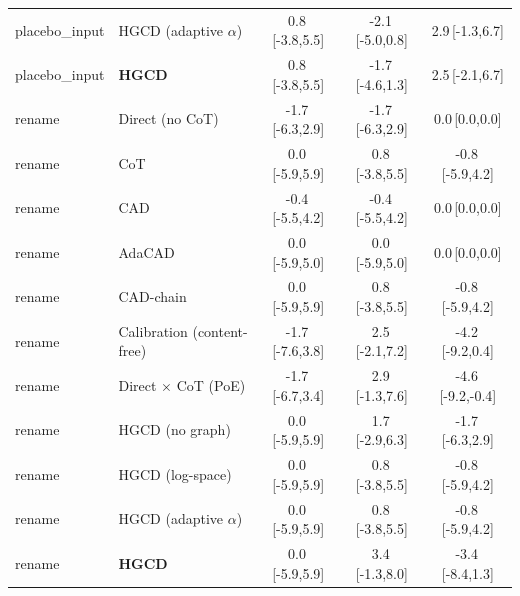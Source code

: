 \begin{tabular}{llccc}
placebo\_input & HGCD (adaptive $\alpha$) & 0.8\,{\scriptsize[-3.8,5.5]} & -2.1\,{\scriptsize[-5.0,0.8]} & 2.9\,{\scriptsize[-1.3,6.7]} \\
placebo\_input & \textbf{HGCD} & 0.8\,{\scriptsize[-3.8,5.5]} & -1.7\,{\scriptsize[-4.6,1.3]} & 2.5\,{\scriptsize[-2.1,6.7]} \\
\midrule
rename & Direct (no CoT) & -1.7\,{\scriptsize[-6.3,2.9]} & -1.7\,{\scriptsize[-6.3,2.9]} & 0.0\,{\scriptsize[0.0,0.0]} \\
rename & CoT & 0.0\,{\scriptsize[-5.9,5.9]} & 0.8\,{\scriptsize[-3.8,5.5]} & -0.8\,{\scriptsize[-5.9,4.2]} \\
rename & CAD & -0.4\,{\scriptsize[-5.5,4.2]} & -0.4\,{\scriptsize[-5.5,4.2]} & 0.0\,{\scriptsize[0.0,0.0]} \\
rename & AdaCAD & 0.0\,{\scriptsize[-5.9,5.0]} & 0.0\,{\scriptsize[-5.9,5.0]} & 0.0\,{\scriptsize[0.0,0.0]} \\
rename & CAD-chain & 0.0\,{\scriptsize[-5.9,5.9]} & 0.8\,{\scriptsize[-3.8,5.5]} & -0.8\,{\scriptsize[-5.9,4.2]} \\
rename & Calibration (content-free) & -1.7\,{\scriptsize[-7.6,3.8]} & 2.5\,{\scriptsize[-2.1,7.2]} & -4.2\,{\scriptsize[-9.2,0.4]} \\
rename & Direct $\times$ CoT (PoE) & -1.7\,{\scriptsize[-6.7,3.4]} & 2.9\,{\scriptsize[-1.3,7.6]} & -4.6\,{\scriptsize[-9.2,-0.4]} \\
rename & HGCD (no graph) & 0.0\,{\scriptsize[-5.9,5.9]} & 1.7\,{\scriptsize[-2.9,6.3]} & -1.7\,{\scriptsize[-6.3,2.9]} \\
rename & HGCD (log-space) & 0.0\,{\scriptsize[-5.9,5.9]} & 0.8\,{\scriptsize[-3.8,5.5]} & -0.8\,{\scriptsize[-5.9,4.2]} \\
rename & HGCD (adaptive $\alpha$) & 0.0\,{\scriptsize[-5.9,5.9]} & 0.8\,{\scriptsize[-3.8,5.5]} & -0.8\,{\scriptsize[-5.9,4.2]} \\
rename & \textbf{HGCD} & 0.0\,{\scriptsize[-5.9,5.9]} & 3.4\,{\scriptsize[-1.3,8.0]} & -3.4\,{\scriptsize[-8.4,1.3]} \\
\bottomrule
\end{tabular}
